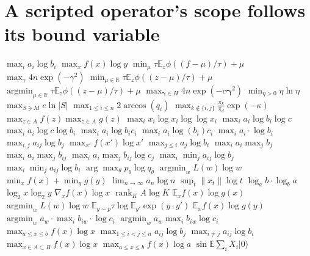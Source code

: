 \documentclass{article}
\begin{document}
\section{A scripted operator's scope follows its bound variable}
$\max_i a_i\log b_i$ $\max_x f(x)\log y$ $\min_{\mu}\tau\mathbb{E}_z\phi((f-\mu)/\tau)+\mu$ $\max_\gamma 4n\exp(-\gamma^2)$
$\min_{\mu\in\mathbb{R}}\tau\mathbb{E}_{z}\phi((z-\mu)/\tau)+\mu$ $\operatorname*{argmin}_{\mu\in\mathbb{R}}\tau\mathbb{E}_{z}\phi((z-\mu)/\tau)+\mu$
$\max_{\boldsymbol{\gamma}\in H}4n\exp(-c\boldsymbol{\gamma}^{2})$ $\min_{\eta>0}\eta\ln\eta$ $\max_{S\ni M}e\ln|S|$
$\max_{1\le i\le n}2\arccos(q_i)$ $\max_{k\notin\{i,j\}}\frac{\pi_k}{\pi_d}\exp(-\kappa)$ $\max_{z\in A}f(z)\max_{z\in A}g(z)$
$\max_{i}x_i\log x_i\log\log x_i$ $\max_i a_i\log b_i\log c$ $\max_i a_i\log c\log b_i$ $\max_i a_i\log b_i c_i$
$\max_i a_i\log(b_i)c_i$ $\max_i a_i\cdot\log b_i$ $\max_{i,j}a_{ij}\log b_j$ $\max_{x'}f(x')\log x'$ $\max_{j\le i}a_j\log b_i$
$\max_i a_i\max_j b_j$ $\max_i a_i\max_j b_{ij}$ $\max_i a_i\max_j b_{ij}\log c_j$ $\max_i\min_j a_{ij}\log b_j$
$\max_i\min_j a_{ij}\log b_i$ $\arg\max_\theta p_\theta\log q_\theta$ $\operatorname*{argmin}_{w}L(w)\log w$
$\min_x f(x)+\min_y g(y)$ $\lim_{n\to\infty}a_n\log n$ $\sup_{t}\|x_t\|\log t$ $\log_a b\cdot\log_b a$ $\log_2 x\log_2 y$
$\nabla_x f(x)\log x$ $\operatorname{rank}_K A\log K$ $\mathbb{E}_x f(x)\log g(x)$ $\operatorname{argmin}_w L(w)\log w$
$\mathbb{E}_{y\sim p}\tau\log\mathbb{E}_{y'}\exp(y\cdot y')$ $\mathbb{E}_x f(x)\log g(y)$
$\operatorname*{argmin}_w a_w\cdot\max_i b_{iw}\cdot\log c_i$ $\operatorname*{argmin}_w a_w\max_i b_{iw}\log c_i$
$\max_{a\le x\le b}f(x)\log x$ $\max_{1\le i<j\le n}a_{ij}\log b_j$ $\max_{i\ne j}a_{ij}\log b_i$
$\max_{x\in A\subset B}f(x)\log x$ $\max_{a\le x\le b}f(x)\log a$ $\sin\mathbb{E}\sum_i X_i|0\rangle$
\end{document}
